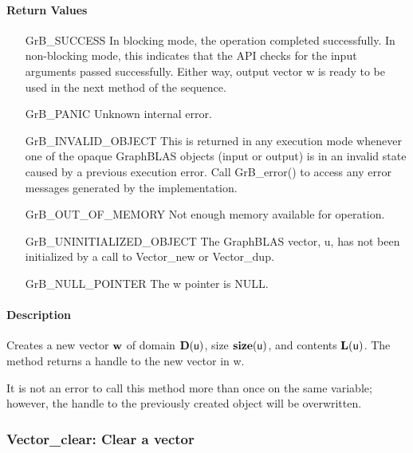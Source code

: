 \paragraph{Return Values}

\begin{itemize}[leftmargin=2.1in]
    \item[{\sf GrB\_SUCCESS}]         In blocking mode, the operation completed
    successfully. In non-blocking mode, this indicates that the API checks 
    for the input arguments passed successfully. Either way, output vector 
    {\sf w} is ready to be used in the next method of the sequence.

    \item[{\sf GrB\_PANIC}]           Unknown internal error.
    
    \item[{\sf GrB\_INVALID\_OBJECT}] This is returned in any execution mode 
    whenever one of the opaque GraphBLAS objects (input or output) is in an invalid 
    state caused by a previous execution error.  Call {\sf GrB\_error()} to access 
    any error messages generated by the implementation.

    \item[{\sf GrB\_OUT\_OF\_MEMORY}] Not enough memory available for operation.
    
    \item[{\sf GrB\_UNINITIALIZED\_OBJECT}]  The GraphBLAS vector, {\sf u}, has 
    not been initialized by a call to {\sf Vector\_new} or {\sf Vector\_dup}.
    
    \item[{\sf GrB\_NULL\_POINTER}]  The {\sf w} pointer is {\sf NULL}.
\end{itemize}

\paragraph{Description}

Creates a new vector ${\bf w}$ of domain $\mathbf{D}({\sf u})$, size 
$\mathbf{size}({\sf u})$, and contents $\mathbf{L}({\sf u})$. The method returns a 
handle to the new vector in {\sf w}.

It is not an error to call this method more than once on the same variable;  
however, the handle to the previously created object will be overwritten. 

\subsubsection{{\sf Vector\_clear}: Clear a vector}

